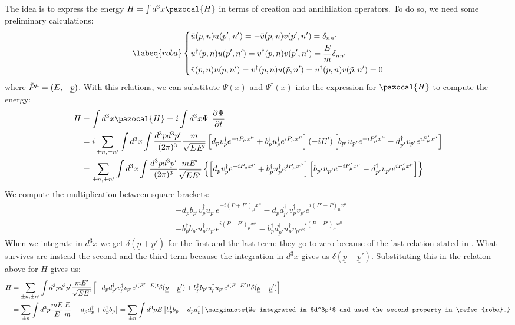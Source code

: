 \documentclass[../main.tex]{subfiles}
\begin{document}
The idea is to express the energy $H=\int d^3x\pazocal{H}$ in terms of creation and annihilation operators. To do so, we need some preliminary calculations:
\begin{equation}
\labeq{roba}
\left\{
\begin{aligned}
&\bar{u}(p,n)u(p',n')=-\bar{v}(p,n)v(p',n')=\delta_{nn'}\\
&u^\dagger(p,n)u(p',n')=v^\dagger(p,n)v(p',n')=\frac{E}{m}\delta_{nn'}\\
&\bar{v}(p,n)u(p,n')=v^\dagger(p,n)u(\Tilde{p},n')=u^\dagger(p,n)v(\Tilde{p},n')=0
\end{aligned}
\right.
\end{equation}
where $\Tilde{P}^\mu=(E,-\underline{p})$.
With this relations, we can substitute $\Psi(x)$ and $\Psi^\dagger(x)$ into the expression for $\pazocal{H}$ to compute the energy:
\begin{align*}
H&=\int d^3x\pazocal{H}=i\int d^3x\Psi^\dagger\frac{\partial\Psi}{\partial t}\\
&=i\sum_{\pm n,\pm n'}\int d^3x\int\frac{d^3pd^3p'}{(2\pi)^3}\frac{m}{\sqrt{EE'}}\left[d_pv^\dagger_pe^{-iP_\mu x^\mu}+b^\dagger_pu^\dagger_pe^{iP_\mu x^\mu}\right](-iE')\left[b_{p'}u_{p'}e^{-iP'_\mu x^\mu}-d^\dagger_{p'}v_{p'}e^{iP'_\mu x^\mu}\right]\\
&=\sum_{\pm n,\pm n'}\int d^3x\int\frac{d^3pd^3p'}{(2\pi)^3}\frac{mE'}{\sqrt{EE'}}\left\{\left[d_pv^\dagger_pe^{-iP_\mu x^\mu}+b^\dagger_pu^\dagger_pe^{iP_\mu x^\mu}\right]\left[b_{p'}u_{p'}e^{-iP'_\mu x^\mu}-d^\dagger_{p'}v_{p'}e^{iP'_\mu x^\mu}\right]\right\}
\end{align*}
We compute the multiplication between square brackets:
\begin{align*}
&+d_pb_{p'}v^\dagger_pu_{p'}e^{-i(P+P')_\mu x^\mu}-d_pd^\dagger_{p'}v^\dagger_pv_{p'}e^{i(P'-P)_\mu x^\mu}\\
&+b^\dagger_pb_{p'}u^\dagger_pu_{p'}e^{i(P-P')_\mu x^\mu}-b^\dagger_pd^\dagger_{p'}u^\dagger_pv_{p'}e^{i(P+P')_\mu x^\mu}
\end{align*}
When we integrate in $d^3x$ we get $\delta(\underline{p}+\underline{p}')$ for the first and the last term: they go to zero because of the last relation stated in . What survives are instead the second and the third term because the integration in $d^3x$ gives us $\delta(\underline{p}-\underline{p}')$. Substituting this in the relation above for $H$ gives us:
\begin{align*}
H&=\sum_{\pm n,\pm n'}\int d^3pd^3p'\frac{mE'}{\sqrt{EE'}}\left[-d_pd^\dagger_{p'}v^\dagger_pv_{p'}e^{i(E'-E)t}\delta(\underline{p}-\underline{p}')+b^\dagger_pb_{p'}u^\dagger_pu_{p'}e^{i(E-E')t}\delta(\underline{p}-\underline{p}')\right]\\
&=\sum_{\pm n}\int d^3p\frac{mE}{E}\frac{E}{m}\left[-d_pd^\dagger_p+b^\dagger_pb_p\right]=\sum_{\pm n}\int d^3pE\left[b^\dagger_pb_p-d_pd^\dagger_p\right]\marginnote{We integrated in $d^3p'$ and used the second property in \refeq{roba}.}
\end{align*}
\end{document}
